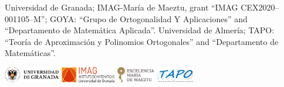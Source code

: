 \documentclass[portrait,final,a0paper,fontscale=0.38]{baposter}
\begin{document}
\begin{poster}
{%
{\noindent\hspace*{-5pt}
\small Universidad de Granada; IMAG-María de Maeztu, grant ``IMAG CEX2020--001105--M''; GOYA: ``Grupo de Ortogonalidad Y Aplicaciones'' and ``Departamento de Matemática Aplicada''.
\noindent Universidad de Almería; TAPO: ``Teoría de Aproximación y Polinomios Ortogonales'' and ``Departamento de Matemáticas''.}
\bigskip
\vspace{0.5pt}
\centerline{
\includegraphics[height=0.68cm]{ugrH} \quad
\includegraphics[height=0.68cm]{IMAG} \quad
\includegraphics[height=0.68cm]{maeztu} \quad
\includegraphics[height=0.68cm]{tapo.png}
}

}
\end{poster}
\end{document}
